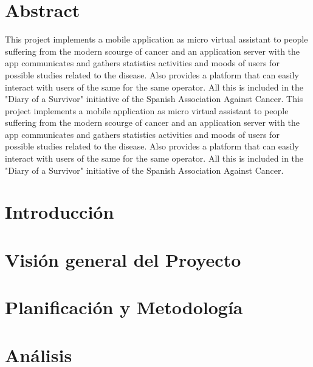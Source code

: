 \documentclass[b5paper,10pt,twoside]{book}
\begin{document}
	\chapter*{Abstract}
	 	This project implements a mobile application as micro virtual assistant to people suffering from the modern scourge of cancer and an application server with the app communicates and gathers statistics activities and moods of users for possible studies related to the disease. Also provides a platform that can easily interact with users of the same for the same operator. All this is included in the "Diary of a Survivor" initiative of the Spanish Association Against Cancer. This project implements a mobile application as micro virtual assistant to people suffering from the modern scourge of cancer and an application server with the app communicates and gathers statistics activities and moods of users for possible studies related to the disease. Also provides a platform that can easily interact with users of the same for the same operator. All this is included in the "Diary of a Survivor" initiative of the Spanish Association Against Cancer.\cite{SHAREESP}
	
	\tableofcontents
	
	\listoffigures
	
	\listoftables
	

	\chapter{Introducción}
	
	
	
	\chapter{Visión general del Proyecto}

	
	
	\chapter{Planificación y Metodología}
	
	
	
	\chapter{Análisis}
	
	
	
\end{document}
